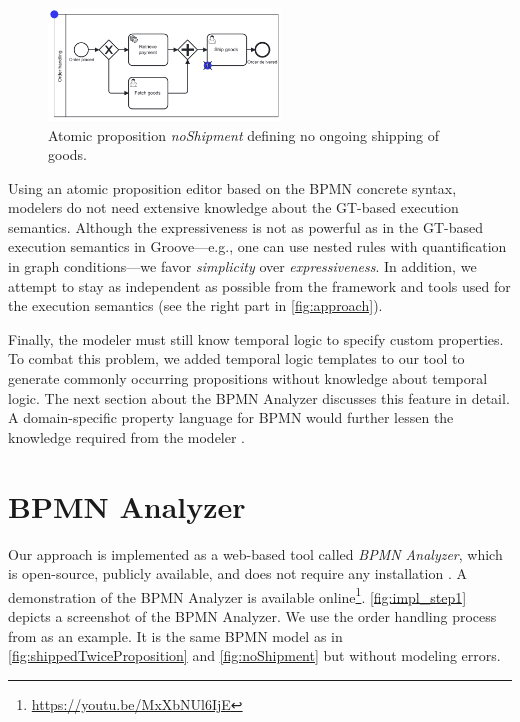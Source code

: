 \documentclass{lmcs} %
\begin{document}
\begin{figure}[ht]
    \centering
    \includegraphics[width=0.55\textwidth]{images/noShipment.pdf}
    \caption{Atomic proposition \textit{noShipment} defining no ongoing shipping of goods.}
    \label{fig:noShipment}
\end{figure}

Using an atomic proposition editor based on the BPMN concrete syntax, modelers do not need extensive knowledge about the GT-based execution semantics. 
Although the expressiveness is not as powerful as in the GT-based execution semantics in Groove---e.g., one can use nested rules with quantification in graph conditions---we favor \textit{simplicity} over \textit{expressiveness}.
In addition, we attempt to stay as independent as possible from the framework and tools used for the execution semantics (see the right part in \autoref{fig:approach}).

Finally, the modeler must still know temporal logic to specify custom properties.
To combat this problem, we added temporal logic templates to our tool to generate commonly occurring propositions without knowledge about temporal logic.
The next section about the BPMN Analyzer discusses this feature in detail.
A domain-specific property language for BPMN would further lessen the knowledge required from the modeler \cite{meyersProMoBoxFrameworkGenerating2014}.

\section{BPMN Analyzer} \label{sec:impl}

Our approach is implemented as a web-based tool called \textit{BPMN Analyzer}, which is open-source, publicly available, and does not require any installation \cite{timkrauterLMCS2024Artifacts2023, krauterFormalizationAnalysisBPMN2023}.
A demonstration of the BPMN Analyzer is available online\footnote{\url{https://youtu.be/MxXbNUl6IjE}}.
\autoref{fig:impl_step1} depicts a screenshot of the BPMN Analyzer.
We use the order handling process from \cite{ruckerPracticalProcessAutomation2021} as an example.
It is the same BPMN model as in \autoref{fig:shippedTwiceProposition} and \autoref{fig:noShipment} but without modeling errors.
\end{document}
